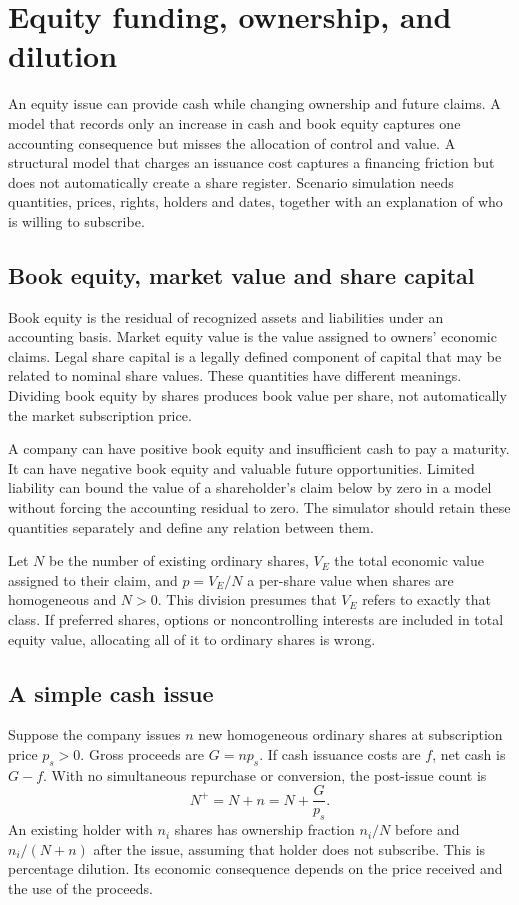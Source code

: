 \chapter[Equity and ownership]{Equity funding, ownership, and dilution}
\label{sim:equity}

An equity issue can provide cash while changing ownership and future claims. A model that records only an increase in cash and book equity captures one accounting consequence but misses the allocation of control and value. A structural model that charges an issuance cost captures a financing friction but does not automatically create a share register. Scenario simulation needs quantities, prices, rights, holders and dates, together with an explanation of who is willing to subscribe.

\section{Book equity, market value and share capital}
Book equity is the residual of recognized assets and liabilities under an accounting basis. Market equity value is the value assigned to owners' economic claims. Legal share capital is a legally defined component of capital that may be related to nominal share values. These quantities have different meanings. Dividing book equity by shares produces book value per share, not automatically the market subscription price.

A company can have positive book equity and insufficient cash to pay a maturity. It can have negative book equity and valuable future opportunities. Limited liability can bound the value of a shareholder's claim below by zero in a model without forcing the accounting residual to zero. The simulator should retain these quantities separately and define any relation between them.

Let $N$ be the number of existing ordinary shares, $V_E$ the total economic value assigned to their claim, and $p=V_E/N$ a per-share value when shares are homogeneous and $N>0$. This division presumes that $V_E$ refers to exactly that class. If preferred shares, options or noncontrolling interests are included in total equity value, allocating all of it to ordinary shares is wrong.

\section{A simple cash issue}
Suppose the company issues $n$ new homogeneous ordinary shares at subscription price $p_s>0$. Gross proceeds are $G=np_s$. If cash issuance costs are $f$, net cash is $G-f$. With no simultaneous repurchase or conversion, the post-issue count is
\begin{equation}
 N^+=N+n=N+\frac{G}{p_s}.
 \label{sim:share-issue}
\end{equation}
An existing holder with $n_i$ shares has ownership fraction $n_i/N$ before and $n_i/(N+n)$ after the issue, assuming that holder does not subscribe. This is percentage dilution. Its economic consequence depends on the price received and the use of the proceeds.

